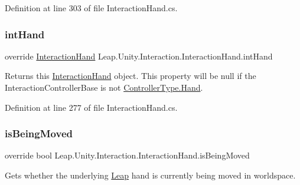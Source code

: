 Definition at line 303 of file Interaction\+Hand.\+cs.

\mbox{\label{class_leap_1_1_unity_1_1_interaction_1_1_interaction_hand_a098b5fc8fdbaeb93681014cd3286e6e1}} 
\subsubsection{\texorpdfstring{intHand}{intHand}}
{\footnotesize\ttfamily override \mbox{\hyperlink{class_leap_1_1_unity_1_1_interaction_1_1_interaction_hand}{Interaction\+Hand}} Leap.\+Unity.\+Interaction.\+Interaction\+Hand.\+int\+Hand\hspace{0.3cm}{\ttfamily [get]}}



Returns this \mbox{\hyperlink{class_leap_1_1_unity_1_1_interaction_1_1_interaction_hand}{Interaction\+Hand}} object. This property will be null if the Interaction\+Controller\+Base is not \mbox{\hyperlink{namespace_leap_1_1_unity_1_1_interaction_a9752eb3e2905e8ebd134fff20c155e6baa78b1ac16c0cd02168097fc9a9bd7604}{Controller\+Type.\+Hand}}. 



Definition at line 277 of file Interaction\+Hand.\+cs.

\mbox{\label{class_leap_1_1_unity_1_1_interaction_1_1_interaction_hand_acbb176be9d544a2f1967770f8af6f4d9}} 
\subsubsection{\texorpdfstring{isBeingMoved}{isBeingMoved}}
{\footnotesize\ttfamily override bool Leap.\+Unity.\+Interaction.\+Interaction\+Hand.\+is\+Being\+Moved\hspace{0.3cm}{\ttfamily [get]}}



Gets whether the underlying \mbox{\hyperlink{namespace_leap_1_1_unity_1_1_leap}{Leap}} hand is currently being moved in worldspace. 




